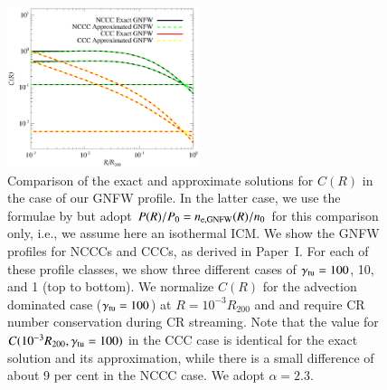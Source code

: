\documentclass[useAMS,usenatbib]{mn2e}
\begin{document}
\begin{appendix}
\begin{figure}
\centering
\includegraphics[width=0.5\textwidth]{figures/CR_profiles_REXexactVSfake.eps}
\caption{Comparison of the exact and approximate solutions for $C(R)$ in the
  case of our GNFW profile. In the latter case, we use the formulae by
  \protect\cite{2011A&A...527A..99E} but adopt $P(R)/P_{0}=n_{{\mathrm{e,GNFW}}}(R)/n_{0}$
  for this comparison only, i.e., we assume here an isothermal ICM. We show the GNFW
  profiles for NCCCs and CCCs, as derived in Paper~I. For each of
  these profile classes, we show three different cases of
  $\gamma_{{\mathrm{tu}}}=100$, 10, and 1 (top to bottom). We normalize $C(R)$ for
  the advection dominated case ($\gamma_{{\mathrm{tu}}}=100$) at $R=10^{-3}R_{200}$
  and and require CR number conservation during CR streaming. Note that the
  value for $C(10^{-3}R_{200},\gamma_{{\mathrm{tu}}}=100)$ in the CCC case is
  identical for the exact solution and its approximation, while there is a small
  difference of about 9 per cent in the NCCC case. We adopt $\alpha=2.3$.}
\label{fig:REXexactVSfake}
\end{figure}


\end{appendix}
\end{document}
